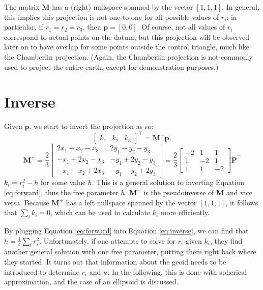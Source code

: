 \documentclass{amsart}[12pt]
\begin{document}
The matrix $\mathbf M$ has a (right) nullspace spanned by the vector $[1,1,1]$.
In general, this implies this projection is not one-to-one for all possible
values of $r_i$: in particular, if $r_1 = r_2 = r_3$, then $\mathbf p = [0,0]$.
Of course, not all values of $r_i$ correspond to actual points on the datum,
but this projection will be observed later on to have overlap for some points
outside the control triangle, much like the Chamberlin projection.
(Again, the Chamberlin projection is not commonly used to project the entire
earth, except for demonstration purposes.)

\section{Inverse}
Given $\mathbf p$, we start to invert the projection as so:
\begin{equation}\label{eq:inverse}
\begin{bmatrix} k_1 & k_2 & k_3

\end{bmatrix}^\top = \mathbf M^+ \mathbf p,
\end{equation}
\begin{equation}
\mathbf M^+ = \frac{2}{3}
\begin{bmatrix} 2x_1 - x_2 - x_3 & 2y_1 - y_2 - y_3 \\
-x_1 + 2x_2 - x_3 & -y_1 + 2y_2 - y_3 \\
-x_1 - x_2 + 2x_3 & -y_1 - y_2 + 2y_3
\end{bmatrix} = \frac{2}{3}
\begin{bmatrix} -2 & 1 & 1 \\
1 & -2 & 1 \\
1 & 1 & -2
\end{bmatrix}
\mathbf P^\top
\end{equation}
$k_i = r^2_i - h$ for some value $h$. This is a general solution to inverting
Equation \ref{eq:forward}, thus the free parameter $h$. $\mathbf M^+$ is the
pseudoinverse of $\mathbf M$ and vice versa. Because $\mathbf M^+$ has a left
nullspace spanned by the vector $[1,1,1]$, it follows that $\sum_i k_i = 0$,
which can be used to calculate $k_i$ more efficiently.

By plugging Equation \ref{eq:forward} into Equation \ref{eq:inverse}, we can
find that $h = \frac{1}{3}\sum_i r^2_i$. Unfortunately, if one attempts to
solve for $r_i$ given $k_i$, they find another general solution with one free
parameter, putting them right back where they started. It turns out that
information about the geoid needs to be introduced to determine $r_i$ and
$\mathbf v$. In the following, this is done with spherical approximation, and
the case of an ellipsoid is discussed.
\end{document}
